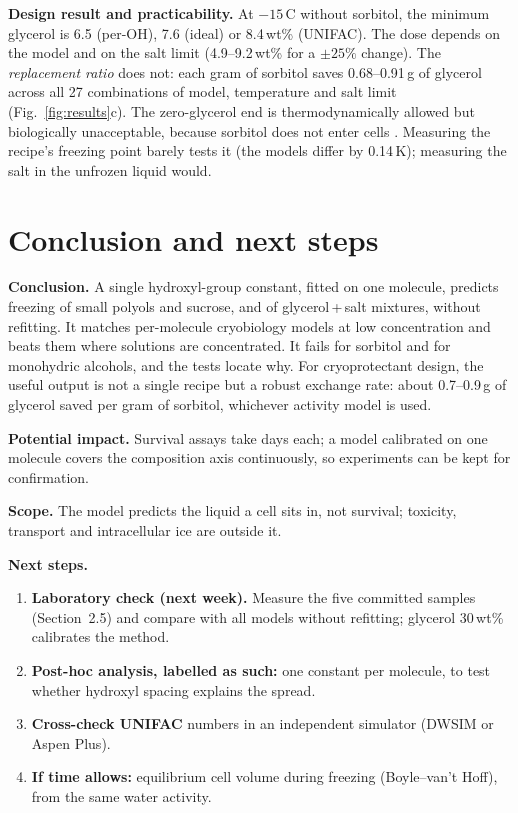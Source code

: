 \documentclass[10pt,a4paper]{article}
\begin{document}
\textbf{Design result and practicability.} At $-15$\,\textdegree C without sorbitol, the minimum glycerol is
6.5 (per-OH), 7.6 (ideal) or 8.4\,wt\% (UNIFAC). The dose depends on the model and on the salt limit
(4.9--9.2\,wt\% for a $\pm25\%$ change). The \emph{replacement ratio} does not: each gram of sorbitol saves
0.68--0.91\,g of glycerol across all 27 combinations of model, temperature and salt limit
(Fig.~\ref{fig:results}c). The zero-glycerol end is thermodynamically allowed but biologically unacceptable,
because sorbitol does not enter cells \cite{pegg}. Measuring the recipe's freezing point barely tests it (the models differ by 0.14\,K); measuring the salt in the
unfrozen liquid would.

\clearpage
\section{Conclusion and next steps}

\textbf{Conclusion.} A single hydroxyl-group constant, fitted on one molecule, predicts freezing of small
polyols and sucrose, and of glycerol\,+\,salt mixtures, without refitting. It matches per-molecule cryobiology
models at low concentration and beats them where solutions are concentrated. It fails for sorbitol and for
monohydric alcohols, and the tests locate why. For cryoprotectant design, the useful output is not a
single recipe but a robust exchange rate: about 0.7--0.9\,g of glycerol saved per gram of sorbitol, whichever
activity model is used.

\textbf{Potential impact.} Survival assays take days each; a model calibrated on one molecule covers the
composition axis continuously, so experiments can be kept for confirmation.

\textbf{Scope.} The model predicts the liquid a cell sits in, not survival; toxicity, transport and intracellular ice are outside it.

\textbf{Next steps.}
\begin{enumerate}
\item \textbf{Laboratory check (next week).} Measure the five committed samples (Section~2.5) and compare
with all models without refitting; glycerol 30\,wt\% calibrates the method.
\item \textbf{Post-hoc analysis, labelled as such:} one constant per molecule, to test whether hydroxyl spacing explains the spread.
\item \textbf{Cross-check UNIFAC} numbers in an independent simulator (DWSIM or Aspen Plus).
\item \textbf{If time allows:} equilibrium cell volume during freezing (Boyle--van't Hoff), from the same water activity.
\end{enumerate}
\end{document}
